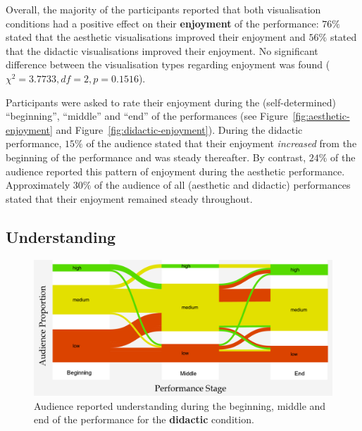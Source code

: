 Overall, the majority of the participants reported that both
visualisation conditions had a positive effect on their
\textbf{enjoyment} of the performance: $76\%$ stated that the
aesthetic visualisations improved their enjoyment and $56\%$ stated
that the didactic visualisations improved their enjoyment. No
significant difference between the visualisation types regarding 
enjoyment was found ($\chi^2=3.7733,df=2,p=0.1516$).

Participants were asked to rate their enjoyment during the
(self-determined) ``beginning'', ``middle'' and ``end'' of the
performances (see Figure~\ref{fig:aesthetic-enjoyment} and
Figure~\ref{fig:didactic-enjoyment}). During the didactic
performance, $15\%$ of the audience stated that their enjoyment
\emph{increased} from the beginning of the performance and was
steady thereafter. By contrast, $24\%$ of the audience
reported this pattern of enjoyment during the aesthetic
performance. Approximately $30\%$ of the audience of all
(aesthetic and didactic) performances stated that their
enjoyment remained steady throughout.

\subsection{Understanding}

\begin{figure}
  \centering
  \includegraphics[width=\columnwidth]{../study-2/results/graphs/didactic-understanding-final}
  \caption{Audience reported understanding during the beginning, middle
    and end of the performance for the \textbf{didactic} condition.}
  \label{fig:didactic-understanding}
\end{figure}

